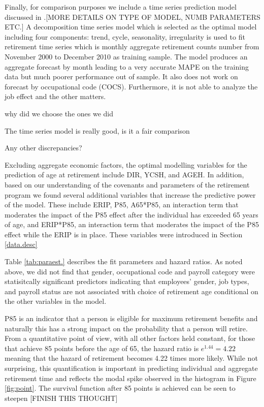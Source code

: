 \documentclass[12pt,letterpaper]{article}
\begin{document}
Finally, for comparison purposes we include a time series prediction model discussed in \cite{zhu2015}.[MORE DETAILS ON TYPE OF MODEL, NUMB PARAMETERS ETC.] A decomposition time series model which is selected as the optimal model including four components: trend, cycle, seasonality, irregularity is used to fit retirement time series which is monthly aggregate retirement counts number from November 2000 to December 2010 as training sample. The model produces an aggregate forecast by month leading to a very accurate MAPE on the training data but much poorer performance out of sample. It also does not work on forecast by occupational code (COCS). Furthermore, it is not able to analyze the job effect and the other matters.

why did we choose the ones we did

The time series model is really good, is it a fair comparison

Any other discrepancies?

Excluding aggregate economic factors, the optimal modelling variables for the prediction of age at retirement include DIR, YCSH, and AGEH.  In addition, based on our understanding of the covenants and parameters of the retirement program we found several additional variables that increase the predictive power of the model. These include ERIP, P85, A65*P85, an interaction term that moderates the impact of the P85 effect after the individual has exceeded 65 years of age, and  ERIP*P85, an interaction term that moderates the impact of the P85 effect while the ERIP is in place.  These variables were introduced in Section \ref{data.desc}

Table \ref{tab:paraest.} describes the fit parameters and hazard ratios.  As noted above, we did not find that gender, occupational code and payroll category were statisitcally significant predictors indicating that employees' gender, job types, and payroll status are not associated with choice of retirement age conditional on the other variables in the model.

P85 is an indicator that a person is eligible for maximum retirement benefits and naturally this has a strong impact on the probability that a person will retire.  From a quantitative point of view, with all other factors held constant, for those that achieve 85 points before the age of 65, the hazard ratio is $e^{1.44} = 4.22$ meaning that the hazard of retirement becomes 4.22 times more likely.  While not surprising, this quantification is important in predicting individual and aggregate retirement time and reflects the modal spike observed in the histogram in Figure \ref{fig:point}.  The survival function after 85 points is achieved can be seen to steepen [FINISH THIS THOUGHT]
\end{document}
